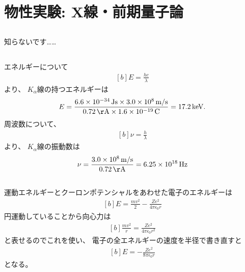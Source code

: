 \documentclass[../../master.tex]{subfiles}
\begin{document}
\section{物性実験: X線・前期量子論}
\subsection{}
知らないです……
\subsection{}
エネルギーについて
\begin{equation}\begin{aligned}[b]
    E = \frac{hc}{\lambda}
\end{aligned}\end{equation}
より、
\(K_\alpha\)線の持つエネルギーは
\begin{equation}\begin{aligned}[b]
    E = \frac{
        6.6\times 10^{-34}\,\si{Js}\times 3.0\times 10^8 \,\si{m/s}
    }{0.72 \,\si{\AA} \times 1.6\times 10^{-19}\,\si{C}}
    = 17.2 \,\si{keV}.
\end{aligned}\end{equation}
周波数について、
\begin{equation}\begin{aligned}[b]
    \nu = \frac{h}{\lambda}
\end{aligned}\end{equation}
より、
\(K_\alpha\)線の振動数は
\begin{equation}\begin{aligned}[b]
    \nu = \frac{3.0\times 10^8 \,\si{m/s}}{0.72 \,\si{\AA}} = 6.25 \times 10^{18}\,\si{Hz}
\end{aligned}\end{equation}

\subsection{}
運動エネルギーとクーロンポテンシャルをあわせた電子のエネルギーは
\begin{equation}\begin{aligned}[b]
    E = \frac{mv^2}{2}-\frac{Ze^2}{4\pi\epsilon_0 r}
\end{aligned}\end{equation}
円運動していることから向心力は
\begin{equation}\begin{aligned}[b]
    \frac{mv^2}{r} = \frac{Ze^2}{4\pi\epsilon_0r^2}
\end{aligned}\end{equation}
と表せるのでこれを使い、
電子の全エネルギーの速度を半径で書き直すと
\begin{equation}\begin{aligned}[b]
    E = -\frac{Ze^2}{8\pi\epsilon_0 r}
\end{aligned}\end{equation}
となる。
\end{document}
